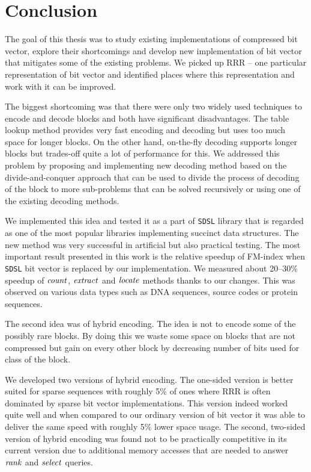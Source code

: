 \chapter*{Conclusion}  %

The goal of this thesis was to study existing implementations of compressed
bit vector, explore their shortcomings and develop new implementation of bit
vector that mitigates some of the existing problems. We picked up RRR -- one
particular representation of bit vector and identified places where this
representation and work with it can be improved. 

The biggest shortcoming was that there were only two widely used techniques to
encode and decode blocks and both have significant disadvantages. The table lookup
method provides very fast encoding and decoding but uses too much space for longer
blocks. On the other hand, on-the-fly decoding supports longer blocks but
trades-off quite a lot of performance for this. We addressed this problem by
proposing and implementing new decoding method based on the divide-and-conquer
approach that can be used to divide the process of decoding of the block to more
sub-problems that can be solved recursively or using one of the existing decoding
methods.

We implemented this idea and tested it as a part of \texttt{SDSL} library that is
regarded as one of the most popular libraries implementing succinct data structures.
The new method was very successful in artificial but also practical testing. The most
important result presented in this work is the relative speedup of FM-index when
\texttt{SDSL} bit vector is replaced by our implementation. We measured about 20--30\%
speedup of $\mathit{count}$, $\mathit{extract}$ and $\mathit{locate}$ methods thanks to our changes. This
was observed on various data types such as DNA sequences, source codes or protein sequences.

The second idea was of hybrid encoding. The idea is not to encode some of the possibly rare
blocks. By doing this we waste some space on blocks that are not compressed but gain
on every other block by decreasing number of bits used for class of the block.

We developed two versions of hybrid encoding. The one-sided version is better
suited for sparse sequences with roughly 5\% of ones where RRR is often dominated by sparse
bit vector implementations. This version indeed worked quite well and when compared to our
ordinary version of bit vector it was able to deliver the same
speed with roughly 5\% lower space usage. The second, two-sided version of hybrid encoding
was found not to be practically competitive in its current version due to additional memory
accesses that are needed to answer $\mathit{rank}$ and $\mathit{select}$ queries. 

